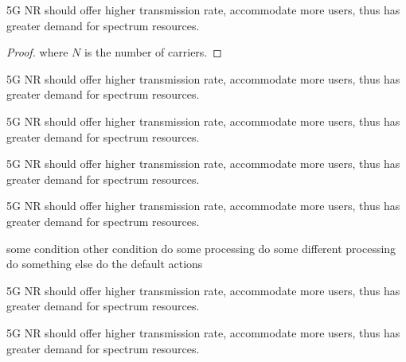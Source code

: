 \documentclass{ccjnl}
\begin{document}
\begin{theorem}
\label{theorem2}
5G NR should offer higher transmission rate, accommodate more users, thus has greater demand for spectrum resources.
\end{theorem}

\begin{proof}
\label{proof2}
where $N$ is the number of carriers. 
\end{proof}

\begin{definition}
\label{definition2}
5G NR should offer higher transmission rate, accommodate more users, thus has greater demand for spectrum resources.
\end{definition}

\begin{lemma}
\label{lemma1}
5G NR should offer higher transmission rate, accommodate more users, thus has greater demand for spectrum resources.
\end{lemma}

\begin{proposition}
\label{proposition1}
5G NR should offer higher transmission rate, accommodate more users, thus has greater demand for spectrum resources.
\end{proposition}

\begin{corollary}
\label{corollary1}
5G NR should offer higher transmission rate, accommodate more users, thus has greater demand for spectrum resources.
\end{corollary}

\begin{breakablealgorithm}
\caption{Euclid’s algorithm.}
\label{euclid}
\begin{algorithmic}[1]
\REQUIRE some condition
\ENSURE other condition
\STATE do some processing 
\STATE do some different processing 
\STATE do something else 
\ELSE 
\STATE do the default actions 
\ENDIF 
\end{algorithmic}
\end{breakablealgorithm}

\begin{example}
\label{example1}
5G NR should offer higher transmission rate, accommodate more users, thus has greater demand for spectrum resources.
\end{example}

\begin{exercise}
\label{exercise1}
5G NR should offer higher transmission rate, accommodate more users, thus has greater demand for spectrum resources.
\end{exercise}
\end{document}
